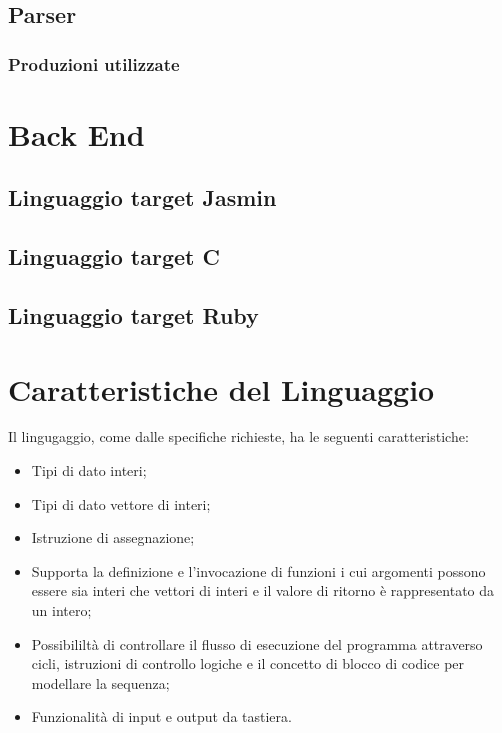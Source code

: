 \documentclass[11pt, a4paper, twoside, notitlepage]{report}
\begin{document}
\section{Parser}
\subsection{Produzioni utilizzate}

\chapter{Back End}
\label{back_end}
\section{Linguaggio target Jasmin}
\section{Linguaggio target C}
\section{Linguaggio target Ruby}

\chapter{Caratteristiche del Linguaggio}
Il lingugaggio, come dalle specifiche richieste, ha le seguenti caratteristiche:
\begin{itemize}
  \item Tipi di dato interi;
  \item Tipi di dato vettore di interi;
  \item Istruzione di assegnazione;
  \item Supporta la definizione e l'invocazione di funzioni i cui argomenti
  possono essere sia interi che vettori di interi e il valore di ritorno è
  rappresentato da un intero;
  \item Possibililtà di controllare il flusso di esecuzione del programma
  attraverso cicli, istruzioni di controllo logiche e il concetto di blocco di
  codice per modellare la sequenza;
  \item Funzionalità di input e output da tastiera.
\end{itemize}
\end{document}
